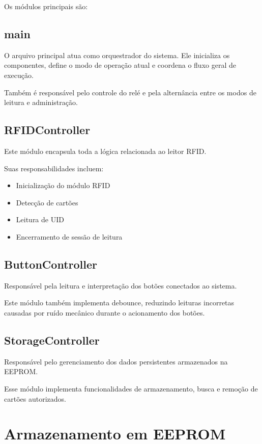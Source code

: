 \documentclass[a4paper,12pt]{article}
\begin{document}
Os módulos principais são:

\subsection{main}

O arquivo principal atua como orquestrador do sistema. Ele inicializa os componentes, define o modo de operação atual e coordena o fluxo geral de execução.

Também é responsável pelo controle do relé e pela alternância entre os modos de leitura e administração.

\subsection{RFIDController}

Este módulo encapsula toda a lógica relacionada ao leitor RFID.

Suas responsabilidades incluem:

\begin{itemize}
    \item Inicialização do módulo RFID
    \item Detecção de cartões
    \item Leitura de UID
    \item Encerramento de sessão de leitura
\end{itemize}

\subsection{ButtonController}

Responsável pela leitura e interpretação dos botões conectados ao sistema.

Este módulo também implementa debounce, reduzindo leituras incorretas causadas por ruído mecânico durante o acionamento dos botões.

\subsection{StorageController}

Responsável pelo gerenciamento dos dados persistentes armazenados na EEPROM.

Esse módulo implementa funcionalidades de armazenamento, busca e remoção de cartões autorizados.

\section{Armazenamento em EEPROM}
\end{document}
